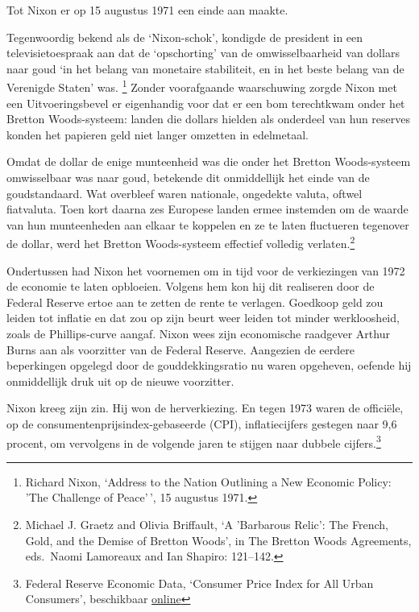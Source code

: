 \documentclass[smalldemyvopaper,11pt,twoside,onecolumn,openright,extrafontsizes,hidelinks]{memoir}
\begin{document}
Tot Nixon er op 15 augustus 1971 een einde aan maakte.

Tegenwoordig bekend als de `Nixon-schok', kondigde de president in een
televisietoespraak aan dat de `opschorting' van de omwisselbaarheid van
dollars naar goud `in het belang van monetaire stabiliteit, en in het
beste belang van de Verenigde Staten' was. \footnote{\hspace{0pt}Richard
  Nixon, `Address to the Nation Outlining a New Economic Policy: 'The
  Challenge of Peace'\,', 15 augustus 1971.} Zonder voorafgaande
waarschuwing zorgde Nixon met een Uitvoeringsbevel er eigenhandig voor
dat er een bom terechtkwam onder het Bretton Woods-systeem: landen die
dollars hielden als onderdeel van hun reserves konden het papieren geld
niet langer omzetten in edelmetaal.

Omdat de dollar de enige munteenheid was die onder het Bretton
Woods-systeem omwisselbaar was naar goud, betekende dit onmiddellijk het
einde van de goudstandaard. Wat overbleef waren nationale, ongedekte
valuta, oftwel fiatvaluta. Toen kort daarna zes Europese landen ermee
instemden om de waarde van hun munteenheden aan elkaar te koppelen en ze
te laten fluctueren tegenover de dollar, werd het Bretton Woods-systeem
effectief volledig verlaten.\footnote{\hspace{0pt}Michael J. Graetz and
  Olivia Briffault, `A 'Barbarous Relic': The French, Gold, and the
  Demise of Bretton Woods', in The Bretton Woods Agreements, eds.~Naomi
  Lamoreaux and Ian Shapiro: 121--142.}

Ondertussen had Nixon het voornemen om in tijd voor de verkiezingen van
1972 de economie te laten opbloeien. Volgens hem kon hij dit realiseren
door de Federal Reserve ertoe aan te zetten de rente te verlagen.
Goedkoop geld zou leiden tot inflatie en dat zou op zijn beurt weer
leiden tot minder werkloosheid, zoals de Phillips-curve aangaf. Nixon
wees zijn economische raadgever Arthur Burns aan als voorzitter van de
Federal Reserve. Aangezien de eerdere beperkingen opgelegd door de
gouddekkingsratio nu waren opgeheven, oefende hij onmiddellijk druk uit
op de nieuwe voorzitter.

Nixon kreeg zijn zin. Hij won de herverkiezing. En tegen 1973 waren de
officiële, op de consumentenprijsindex-gebaseerde (CPI), inflatiecijfers
gestegen naar 9,6 procent, om vervolgens in de volgende jaren te stijgen
naar dubbele cijfers.\footnote{Federal Reserve Economic Data, `Consumer
  Price Index for All Urban Consumers', beschikbaar
  \href{https://fred.stlouisfed.org/series/CPIAUCSL}{online}}
\end{document}
